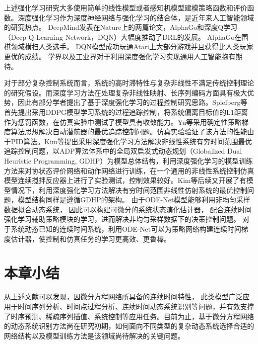 上述强化学习研究大多使用简单的线性模型或者感知机模型建模策略函数和评价函数。深度强化学习作为深度神经网络与强化学习的结合体，是近年来人工智能领域的研究热点。
DeepMind发表在Nature上的两篇论文，AlphaGo\cite{silver2017mastering}和深度Q学习（Deep Q-Learning Network，DQN）\cite{mnih2015human}大幅度推动了DRL的发展。
AlphaGo在围棋领域横扫人类选手。
DQN模型成功玩通Atari上大部分游戏并且获得比人类玩家更优的成绩。
学界以及工业界对于利用深度强化学习实现通用人工智能抱有期待。

对于部分复杂控制系统而言，系统的高时滞特性与复杂非线性不满足传统控制理论的研究假设。而深度学习方法在处理复杂非线性映射、长序列编码方面具有极大优势，因此有部分学者提出了基于深度强化学习的过程控制研究思路。Spielberg等\cite{7983780}首先提出采用DDPG模型学习系统的过程追踪控制，将系统偏离目标值的L1距离作为惩罚函数，在仿真实验中测试了模型具有收敛能力。Yu等\cite{yu2017deep}采用确定性策略梯度算法思想解决自动潜航器的最优追踪控制问题。仿真实验验证了该方法的性能由于PID算法。Kim等\cite{kim2018deep}提出采用深度强化学习方法解决非线性系统有穷时间范围最优追踪控制问题，以ADP算法体系中的全局双启发式动态规划（Globalized Dual Heuristic Programming, GDHP）为模型总体结构，利用深度强化学习的模型训练方法来对协状态评价网络和动作网络进行训练，在一个通用的非线性系统控制仿真模型连续搅拌反应器上进行了实验测试，控制效果较好。Kim等\cite{kim2020model}后续又开展了有模型情况下，利用深度强化学习方法解决有穷时间范围非线性仿射系统的最优控制问题，模型结构同样是遵循GDHP的架构。
由于ODE-Net模型能够利用非均匀采样数据拟合动态系统，
因此可以构建可微分的系统状态演化估计器，
配合连续时间强化学习辅助策略模块的学习，进而解决非均匀采样数据下的决策控制问题\cite{Yildiz2021}。
对于系统动态已知的连续时间系统，利用ODE-Net可以为策略网络构建连续时间梯度估计器\cite{Ainsworth2020}，使控制和仿真任务的学习更高效、更鲁棒。


\section{本章小结}
从上述文献可以发现，因微分方程网络所具备的连续时间特性，
此类模型广泛应用于时间序列分析、时间点过程分析、连续时间动态系统识别等问题，并有效支撑了时序预测、稀疏序列插值、系统控制等应用任务。目前为止，基于微分方程网络的动态系统识别方法尚在研究初期，如何面向不同类型的复杂动态系统选择合适的网络结构以及模型训练方法是该领域尚待解决的关键问题。
